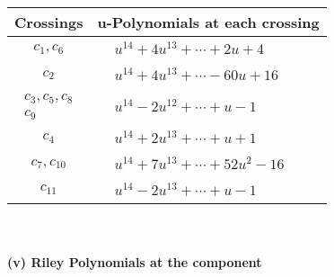 \documentclass[1p]{elsarticle_modified}
\theoremstyle{definition}
\begin{document}
\begin{tabular}{m{50pt}|m{274pt}}
Crossings & \hspace{64pt}u-Polynomials at each crossing \\
\hline $$\begin{aligned}c_{1},c_{6}\end{aligned}$$&$\begin{aligned}
&u^{14}+4 u^{13}+\cdots+2 u+4
\end{aligned}$\\
\hline $$\begin{aligned}c_{2}\end{aligned}$$&$\begin{aligned}
&u^{14}+4 u^{13}+\cdots-60 u+16
\end{aligned}$\\
\hline $$\begin{aligned}c_{3},c_{5},c_{8}\\c_{9}\end{aligned}$$&$\begin{aligned}
&u^{14}-2 u^{12}+\cdots+u-1
\end{aligned}$\\
\hline $$\begin{aligned}c_{4}\end{aligned}$$&$\begin{aligned}
&u^{14}+2 u^{13}+\cdots+u+1
\end{aligned}$\\
\hline $$\begin{aligned}c_{7},c_{10}\end{aligned}$$&$\begin{aligned}
&u^{14}+7 u^{13}+\cdots+52 u^2-16
\end{aligned}$\\
\hline $$\begin{aligned}c_{11}\end{aligned}$$&$\begin{aligned}
&u^{14}-2 u^{13}+\cdots+u-1
\end{aligned}$\\
\hline
\end{tabular}\\~\\
\newpage\renewcommand{\arraystretch}{1}
\flushleft \textbf{(v) Riley Polynomials at the component}\newline \\
\end{document}
